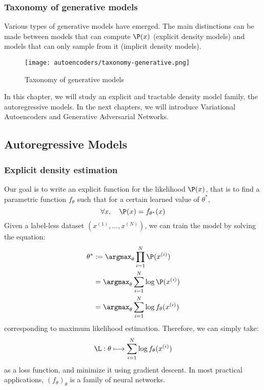 \subsubsection{Taxonomy of generative models}
Various types of generative models have emerged. The main distinctions can be made between models that can compute $\P(x)$ (explicit density models) and models that can only sample from it (implicit density models).
\begin{figure}[H]
    \centering
    \texttt{[image: autoencoders/taxonomy-generative.png]}
    \caption{Taxonomy of generative models}
\end{figure}
In this chapter, we will study an explicit and tractable density model family, the autoregressive models. In the next chapters, we will introduce Variational Autoencoders and Generative Adversarial Networks.

\subsection{Autoregressive Models}
\subsubsection{Explicit density estimation}
Our goal is to write an explicit function for the likelihood $\P(x)$, that is to find a parametric function $f_\theta$ such that for a certain learned value of $\theta^*$,
\begin{equation*}
    \forall x,\quad \P(x) = f_{\theta^*}(x)
\end{equation*}
Given a label-less dataset $(x^{(1)}, \dots, x^{(N)})$, we can train the model by solving the equation:
\begin{equation*}
    \begin{aligned}
        \theta^* &:= \argmax_\theta \prod_{i=1}^N \P(x^{(i)})\\
        &= \argmax_\theta \sum_{i=1}^N \log\P(x^{(i)})\\
        &= \argmax_\theta \sum_{i=1}^N \log f_\theta(x^{(i)})
    \end{aligned}
\end{equation*}
corresponding to maximum likelihood estimation. Therefore, we can simply take:
\begin{equation*}
    \L : \theta \longmapsto \sum_{i=1}^N \log f_\theta(x^{(i)})
\end{equation*}
as a loss function, and minimize it using gradient descent. In most practical applications, $\left(f_\theta\right)_\theta$ is a family of neural networks.

